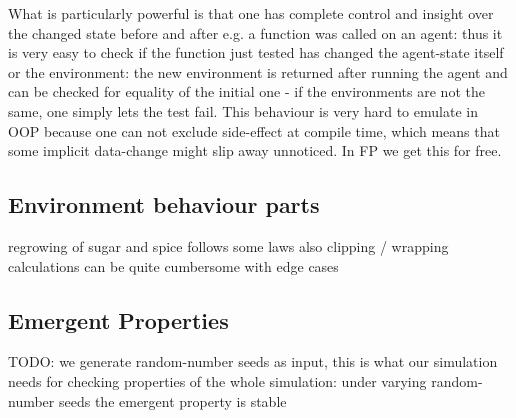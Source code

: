 What is particularly powerful is that one has complete control and insight over the changed state before and after e.g. a function was called on an agent: thus it is very easy to check if the function just tested has changed the agent-state itself or the environment: the new environment is returned after running the agent and can be checked for equality of the initial one - if the environments are not the same, one simply lets the test fail. This behaviour is very hard to emulate in OOP because one can not exclude side-effect at compile time, which means that some implicit data-change might slip away unnoticed. In FP we get this for free.

\subsection{Environment behaviour parts}
regrowing of sugar and spice follows some laws
also clipping / wrapping calculations can be quite cumbersome with edge cases

\subsection{Emergent Properties}
TODO: we generate random-number seeds as input, this is what our simulation needs for checking properties of the whole simulation: under varying random-number seeds the emergent property is stable
